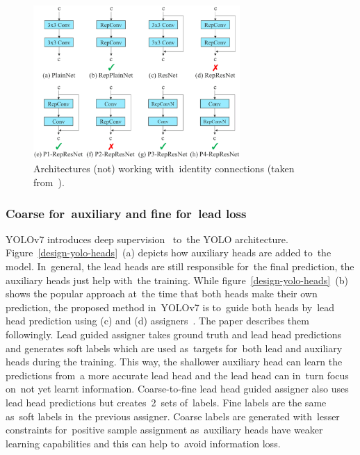 \vspace{-2pt}
\begin{figure}[!hbt]
    \centering
    \includegraphics[width=0.7\textwidth]{img/design/yolov7-reparameterization.png}
    \caption{Architectures (not) working with~identity connections (taken from~\cite{yolov7}).}
    \label{design-yolo-reparameterization}
\end{figure}

\subsubsection{Coarse for~auxiliary and fine for~lead loss}
YOLOv7 introduces deep supervision~\cite{deep-supervision} to~the YOLO architecture. Figure~\ref{design-yolo-heads}~(a) depicts how auxiliary heads are added to~the model. In~general, the lead heads
are still responsible for~the final prediction, the auxiliary heads just help with~the training. While figure~\ref{design-yolo-heads}~(b) shows the popular approach at~the time that both heads make their own prediction, the proposed method in~YOLOv7 is to~guide both heads by~lead head prediction using (c) and (d) assigners~\cite{yolov7}. The paper describes them followingly. Lead guided assigner takes ground truth and lead head predictions and generates soft labels which are used as~targets for~both lead and auxiliary heads during the training. This way, the shallower auxiliary head can learn the predictions from~a more accurate lead head and the lead head can in~turn focus on~not yet learnt information. Coarse-to-fine lead head guided assigner also uses lead head predictions but creates~2~sets of~labels. Fine labels are the same as~soft labels in~the previous assigner. Coarse labels are generated with~lesser constraints for~positive sample assignment as~auxiliary heads have weaker learning capabilities and this can help to~avoid information loss.

